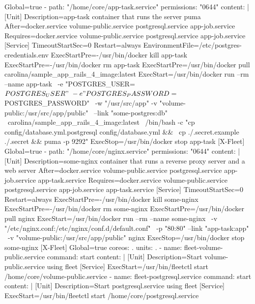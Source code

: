 \begin{codelisting}
\begin{code}
      [X-Fleet]
      Global=true
  - path: "/home/core/app-task.service"
    permissions: "0644"
    content: |
      [Unit] 
      Description=app-task container that runs the server puma
      After=docker.service volume-public.service postgresql.service 
            app-job.service
      Requires=docker.service volume-public.service postgresql.service 
               app-job.service
      [Service] 
      TimeoutStartSec=0
      Restart=always 
      EnvironmentFile=/etc/postgres-credentials.env
      ExecStartPre=-/usr/bin/docker kill app-task 
      ExecStartPre=-/usr/bin/docker rm app-task
      ExecStartPre=/usr/bin/docker pull carolina/sample_app_rails_4_image:latest 
      ExecStart=/usr/bin/docker run --rm --name app-task \
      -e "POSTGRES_USER=${POSTGRES_USER}" \
      -e "POSTGRES_PASSWORD=${POSTGRES_PASSWORD}" \
      -w "/usr/src/app" -v "volume-public:/usr/src/app/public" \
      --link "some-postgres:db" \
      carolina/sample_app_rails_4_image:latest \
      /bin/bash -c "cp config/database.yml.postgresql config/database.yml && \
      cp ./.secret.example ./.secret && puma -p 9292"
      ExecStop=/usr/bin/docker stop app-task
      [X-Fleet]
      Global=true
  - path: "/home/core/nginx.service"
    permissions: "0644"
    content: |
      [Unit] 
      Description=some-nginx container that runs a reverse proxy server and a 
                  web server
      After=docker.service volume-public.service postgresql.service 
            app-job.service app-task.service
      Requires=docker.service volume-public.service postgresql.service 
               app-job.service app-task.service
      [Service] 
      TimeoutStartSec=0
      Restart=always 
      ExecStartPre=-/usr/bin/docker kill some-nginx 
      ExecStartPre=-/usr/bin/docker rm some-nginx
      ExecStartPre=/usr/bin/docker pull nginx 
      ExecStart=/usr/bin/docker run --rm --name some-nginx \
      -v "/etc/nginx.conf:/etc/nginx/conf.d/default.conf" \
      -p "80:80" --link "app-task:app" \
      -v "volume-public:/usr/src/app/public" nginx 
      ExecStop=/usr/bin/docker stop some-nginx
      [X-Fleet]
      Global=true
coreos:
  .
  units:
  .
  - name: fleet-volume-public.service
    command: start
    content: |
      [Unit]
      Description=Start volume-public.service using fleet
      [Service]
      ExecStart=/usr/bin/fleetctl start /home/core/volume-public.service
  - name: fleet-postgresql.service
    command: start
    content: |
      [Unit]
      Description=Start postgresql.service using fleet
      [Service]
      ExecStart=/usr/bin/fleetctl start /home/core/postgresql.service

\end{code}
\end{codelisting}
